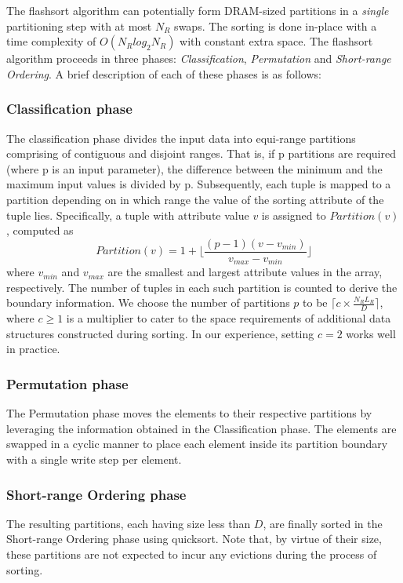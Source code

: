 The flashsort algorithm can potentially form DRAM-sized partitions in a
\emph{single} partitioning step with at most $N_R$ swaps. The sorting is done
in-place with a time complexity of $O(N_Rlog_2N_R)$ with constant extra space.
The flashsort algorithm proceeds in three phases: \emph{Classification},
\emph{Permutation} and \emph{Short-range Ordering}. A brief description of each
of these phases is as follows:

\subsubsection{Classification phase} The classification phase divides the input
data into equi-range partitions comprising of contiguous and disjoint ranges.
That is, if p partitions are required (where p is an input parameter), the
difference between the minimum and the maximum input values is divided by p.
Subsequently, each tuple is mapped to a partition depending on in which range
the value of the sorting attribute of the tuple lies.  Specifically, a tuple
with attribute value $v$ is assigned to $Partition(v)$, computed as
$$Partition(v) = 1 + \lfloor \frac{(p-1)(v- v_{min})}{v_{max}-v_{min}} \rfloor$$
where $v_{min}$ and $v_{max}$ are the smallest and largest attribute values in
the array, respectively. The number of tuples in each such partition is counted
to derive the boundary information.  We choose the number of partitions $p$ to
be $\lceil c \times \frac{N_R L_R}{D} \rceil$, where $c \geq 1$ is a multiplier
to cater to the space requirements of additional data structures constructed
during sorting. In our experience, setting $c = 2$ works well in practice.

\subsubsection{Permutation phase} The Permutation phase moves the elements to
their respective partitions by leveraging the information obtained in the
Classification phase. The elements are swapped in a cyclic manner to place each
element inside its partition boundary with a single write step per element. 

\subsubsection{Short-range Ordering phase} The resulting partitions, each having
size less than $D$, are finally sorted in the Short-range Ordering phase using
quicksort. Note that, by virtue of their size, these partitions are not expected
to incur any evictions during the process of sorting.  \\

